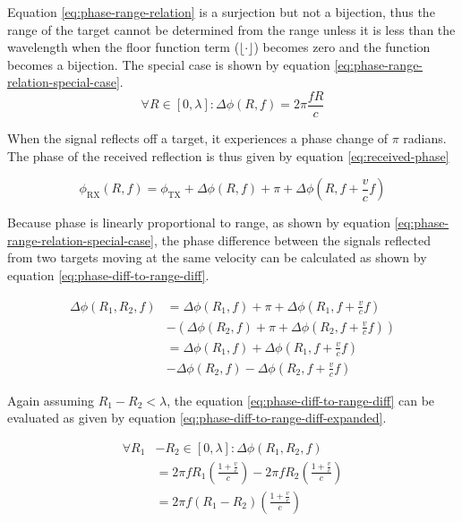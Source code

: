 Equation \ref{eq:phase-range-relation} is a surjection but not a bijection,
thus the range of the target cannot be determined from the range unless it is less than the wavelength
when the floor function term ($\lfloor \cdot \rfloor$) becomes zero and the function becomes a bijection.
The special case is shown by equation \ref{eq:phase-range-relation-special-case}.
\begin{equation}
    \label{eq:phase-range-relation-special-case}
    \forall R \in [0, \lambda] : \Delta \phi (R, f) = 2\pi \frac{fR}{c} 
\end{equation}

When the signal reflects off a target, it experiences a phase change of $\pi$ radians.
The phase of the received reflection is thus given by equation \ref{eq:received-phase}

\begin{equation}
    \label{eq:received-phase}
    \phi_{\mathrm{RX}}(R,f) = \phi_{\mathrm{TX}}
    + \Delta \phi(R, f) + \pi + \Delta \phi(R, f+\frac{v}{c}f)
\end{equation}

Because phase is linearly proportional to range,
as shown by equation \ref{eq:phase-range-relation-special-case},
the phase difference between the signals reflected from two targets moving at the same velocity
can be calculated as shown by equation \ref{eq:phase-diff-to-range-diff}.

\begin{equation}
    \label{eq:phase-diff-to-range-diff}
    \begin{aligned}
    \Delta \phi(R_1, R_2,f) &= \Delta \phi(R_1, f) + \pi + \Delta \phi(R_1, f+\frac{v}{c}f) \\
        &- \left( \Delta \phi(R_2, f) + \pi + \Delta \phi(R_2, f+\frac{v}{c}f)  \right) \\
        &= \Delta \phi(R_1, f) + \Delta \phi(R_1, f+\frac{v}{c}f) \\
        &- \Delta \phi(R_2, f) - \Delta \phi(R_2, f+\frac{v}{c}f) 
    \end{aligned}
\end{equation}

Again assuming $R_1 - R_2 < \lambda$, the equation \ref{eq:phase-diff-to-range-diff} can be evaluated as
given by equation \ref{eq:phase-diff-to-range-diff-expanded}.

\begin{equation}
    \label{eq:phase-diff-to-range-diff-expanded}
    \begin{aligned}
        \forall R_1 &- R_2 \in [0, \lambda] : \Delta \phi(R_1, R_2, f) \\
        &= 2\pi f R_1 \left( \frac{1+\frac{v}{c} }{c} \right)
        - 2\pi f R_2 \left( \frac{1+\frac{v}{c} }{c} \right) \\
        &= 2\pi f (R_1-R_2) \left( \frac{1+\frac{v}{c} }{c} \right)
    \end{aligned}
\end{equation}

